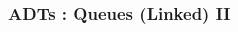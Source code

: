 
\begin{frame}[fragile]
\frametitle{ADTs : Queues (Linked) II}
\begin{columns}[T]

\begin{column}{0.45\textwidth}

\end{column}

\pause
\begin{column}{0.45\textwidth}

\end{column}

\end{columns}
\end{frame}


